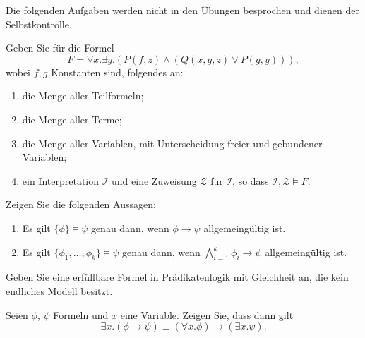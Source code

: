 \documentclass[german]{latteachCD}[2017/03/28]
\begin{document}
\maketitle

\begin{mdframed}
  Die folgenden Aufgaben werden nicht in den Übungen besprochen und dienen der
  Selbstkontrolle.

  \renewcommand{\theexercise}{\Roman{exercise}}
  \setcounter{exercise}{0}

  \begin{exercise}
    Geben Sie für die Formel
    \begin{equation*}
      F = \forall x. \exists y. (P(f,z) \land (Q(x,g,z) \lor P(g,y))),
    \end{equation*}
    wobei $f,g$ Konstanten sind, folgendes an:
    \begin{enumerate}
    \item die Menge aller Teilformeln;
    \item die Menge aller Terme;
    \item die Menge aller Variablen, mit Unterscheidung freier und gebundener
      Variablen;
    \item ein Interpretation $\mathcal{I}$ und eine Zuweisung $\mathcal{Z}$ für
      $\mathcal{I}$, so dass $\mathcal{I}, \mathcal{Z} \models F$.
    \end{enumerate}
  \end{exercise}

  \begin{exercise}
    Zeigen Sie die folgenden Aussagen:
    \begin{enumerate}
    \item Es gilt $\{\phi\} \models \psi$ genau dann, wenn $\phi \to \psi$
      allgemeingültig ist.
    \item Es gilt $\{\phi_{1}, \dots, \phi_{k}\} \models \psi$ genau dann, wenn
      $\bigwedge_{i=1}^{k} \phi_{i} \to \psi$ allgemeingültig ist.
    \end{enumerate}
  \end{exercise}

  \begin{exercise}
    Geben Sie eine erfüllbare Formel in Prädikatenlogik mit Gleichheit an, die
    kein endliches Modell besitzt.
  \end{exercise}

  \begin{exercise}
    Seien $\phi$, $\psi$ Formeln und $x$ eine Variable.  Zeigen Sie, dass dann gilt
    \begin{equation*}
      \exists x.(\phi \to \psi) \equiv (\forall x. \phi) \to (\exists x. \psi).
    \end{equation*}
  \end{exercise}
  \vspace*{-1.5\baselineskip}
\end{mdframed}
\end{document}
